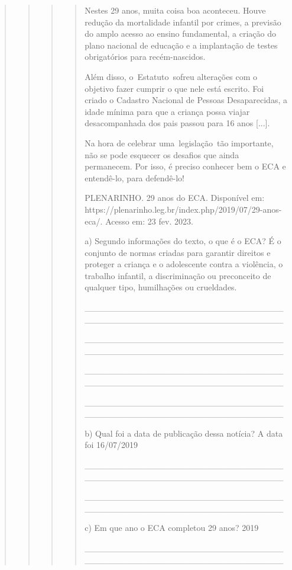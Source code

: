 \begin{quote}
\begin{quote}
\begin{quote}
\begin{quote}
Nestes 29 anos, muita coisa boa aconteceu. Houve redução da mortalidade
infantil por crimes, a previsão do amplo acesso ao ensino fundamental, a
criação do plano nacional de educação e a implantação de testes
obrigatórios para recém-nascidos.

\protect\hypertarget{_Hlk128033654}{}{}Além disso, o~Estatuto~sofreu
alterações com o objetivo fazer cumprir o que nele está escrito. Foi
criado o Cadastro Nacional de Pessoas Desaparecidas, a idade mínima para
que a criança possa viajar desacompanhada dos pais passou para 16 anos
{[}...{]}.

Na hora de celebrar uma~legislação~tão importante, não se pode esquecer
os desafios que ainda permanecem. Por isso, é preciso conhecer bem o ECA
e entendê-lo, para defendê-lo!

PLENARINHO. 29 anos do ECA. Disponível em:
https://plenarinho.leg.br/index.php/2019/07/29-anos-eca/. Acesso em: 23
fev. 2023.

a) Segundo informações do texto, o que é o ECA? É o conjunto de normas
criadas para garantir direitos e proteger a criança e o adolescente
contra a violência, o trabalho infantil, a discriminação ou preconceito
de qualquer tipo, humilhações ou crueldades.

\_\_\_\_\_\_\_\_\_\_\_\_\_\_\_\_\_\_\_\_\_\_\_\_\_\_\_\_\_\_\_\_\_\_\_\_\_\_\_\_\_\_\_\_\_\_\_\_\_\_\_\_\_\_\_\_\_\_\_\_\_\_\_\_

\_\_\_\_\_\_\_\_\_\_\_\_\_\_\_\_\_\_\_\_\_\_\_\_\_\_\_\_\_\_\_\_\_\_\_\_\_\_\_\_\_\_\_\_\_\_\_\_\_\_\_\_\_\_\_\_\_\_\_\_\_\_\_\_

\_\_\_\_\_\_\_\_\_\_\_\_\_\_\_\_\_\_\_\_\_\_\_\_\_\_\_\_\_\_\_\_\_\_\_\_\_\_\_\_\_\_\_\_\_\_\_\_\_\_\_\_\_\_\_\_\_\_\_\_\_\_\_\_

\_\_\_\_\_\_\_\_\_\_\_\_\_\_\_\_\_\_\_\_\_\_\_\_\_\_\_\_\_\_\_\_\_\_\_\_\_\_\_\_\_\_\_\_\_\_\_\_\_\_\_\_\_\_\_\_\_\_\_\_\_\_\_\_

b) Qual foi a data de publicação dessa notícia? A data foi 16/07/2019~

\_\_\_\_\_\_\_\_\_\_\_\_\_\_\_\_\_\_\_\_\_\_\_\_\_\_\_\_\_\_\_\_\_\_\_\_\_\_\_\_\_\_\_\_\_\_\_\_\_\_\_\_\_\_\_\_\_\_\_\_\_\_\_\_

\_\_\_\_\_\_\_\_\_\_\_\_\_\_\_\_\_\_\_\_\_\_\_\_\_\_\_\_\_\_\_\_\_\_\_\_\_\_\_\_\_\_\_\_\_\_\_\_\_\_\_\_\_\_\_\_\_\_\_\_\_\_\_\_

c) Em que ano o ECA completou 29 anos? 2019

\_\_\_\_\_\_\_\_\_\_\_\_\_\_\_\_\_\_\_\_\_\_\_\_\_\_\_\_\_\_\_\_\_\_\_\_\_\_\_\_\_\_\_\_\_\_\_\_\_\_\_\_\_\_\_\_\_\_\_\_\_\_\_\_


\end{quote}
\end{quote}
\end{quote}
\end{quote}
